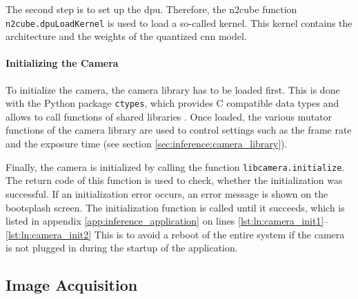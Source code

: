 The second step is to set up the \acrshort{dpu}.
Therefore, the \acrshort{n2cube} function \texttt{n2cube.dpuLoadKernel} is used to load a so-called kernel.
This kernel contains the architecture and the weights of the quantized \acrshort{cnn} model.

\paragraph{Initializing the Camera}
To initialize the camera, the camera library has to be loaded first.
This is done with the Python package \texttt{ctypes}, which provides C compatible data types and allows to call functions of shared libraries \cite{inf_ctypes}.
Once loaded, the various mutator functions of the camera library are used to control settings such as the frame rate and the exposure time (see section \ref{sec:inference:camera_library}).

Finally, the camera is initialized by calling the function \texttt{libcamera.initialize}.
The return code of this function is used to check, whether the initialization was successful.
If an initialization error occurs, an error message is shown on the bootsplash screen.
The initialization function is called until it succeeds, which is listed in appendix \ref{app:inference_application} on lines \ref{lst:ln:camera_init1}--\ref{lst:ln:camera_init2}
This is to avoid a reboot of the entire system if the camera is not plugged in during the startup of the application.

\subsection{Image Acquisition}
\label{subsec:inference:app:image_acquisition}


